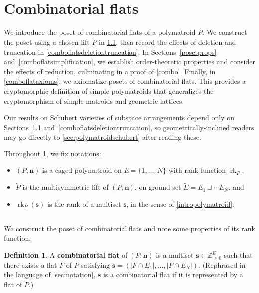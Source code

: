 \documentclass[11pt]{article}
\theoremstyle{definition}
\newtheorem{defi}[theo]{Definition}
\numberwithin{equation}{section}
\newcommand{\N}{\mathbb{Z}_{\geq 0}}
\DeclareMathOperator{\rk}{rk}
\newcommand{\word}[1]{\textbf{#1}}
\begin{document}
\section{Combinatorial flats}\label{comboflats}
We introduce the poset of combinatorial flats of a polymatroid $P$.
We construct the poset using a chosen lift $\widetilde P$ in \cref{comboflatsminimum}, then record the effects of deletion and truncation in \cref{comboflatsdeletiontruncation}.
In Sections~\ref{posetprops} and~\ref{comboflatsimplification}, we establish order-theoretic properties and consider the effects of reduction, culminating in a proof of \cref{combo}.
Finally, in \cref{comboflataxioms}, we axiomatize posets of combinatorial flats. This provides a cryptomorphic definition of simple polymatroids that generalizes the cryptomorphism of simple matroids and geometric lattices.

Our results on Schubert varieties of subspace arrangements depend only on Sections~\ref{comboflatsminimum} and~\ref{comboflatsdeletiontruncation}, so geometrically-inclined readers may go directly to \cref{sec:polymatroidschubert} after reading these.

Throughout \cref{comboflats}, we fix notations:
\begin{itemize}
\item $(P, \mathbf n)$ is a caged polymatroid on $E = \{1, \ldots, N\}$ with rank function $\rk_P$,
\item $\widetilde P$ is the multisymmetric lift of $(P, \mathbf n)$, on ground set $\widetilde E = E_1 \sqcup \cdots E_N$, and
\item $\rk_P(\mathbf s)$ is the rank of a multiset $\mathbf s$, in the sense of \cref{intropolymatroid}.
\end{itemize}


\subsection{} \label{comboflatsminimum} We construct the poset of combinatorial flats and note some properties of its rank function.
\begin{defi}\label{defnCombFlat}
    A \word{combinatorial flat} of $(P, \mathbf n)$ is a multiset $\mathbf s \in \N^E$ such that there exists a flat $F$ of $\widetilde P$ satisfying $\mathbf s = (|F \cap E_1|, \ldots, |F \cap E_N|)$.
    (Rephrased in the language of \cref{sec:notation}, $\mathbf s$ is a combinatorial flat if it is represented by a flat of $\widetilde P$.)
\end{defi}
\end{document}
